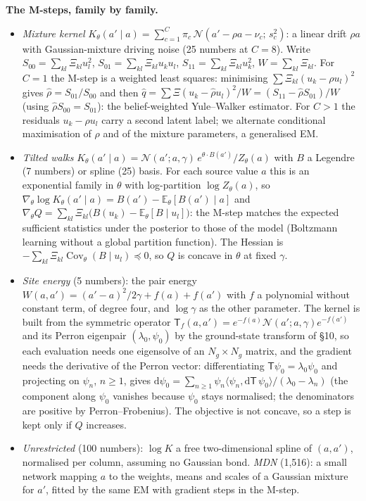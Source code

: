 \textbf{The M-steps, family by family.}
\begin{itemize}
\item \emph{Mixture kernel} $K_\theta(a'\mid a)=\sum_{c=1}^C\pi_c\,\mathcal N(a'-\rho a-\nu_c;\,s_c^2)$: a linear drift $\rho a$ with Gaussian-mixture driving noise (25 numbers at $C=8$). Write $S_{00}=\sum_{kl}\Xi_{kl}u_l^2$, $S_{01}=\sum_{kl}\Xi_{kl}u_ku_l$, $S_{11}=\sum_{kl}\Xi_{kl}u_k^2$, $W=\sum_{kl}\Xi_{kl}$.
For $C=1$ the M-step is a weighted least squares: minimising $\sum\Xi_{kl}(u_k-\rho u_l)^2$ gives $\hat\rho=S_{01}/S_{00}$ and then $\hat q=\sum\Xi(u_k-\hat\rho u_l)^2/W=(S_{11}-\hat\rho S_{01})/W$ (using $\hat\rho S_{00}=S_{01}$): the belief-weighted Yule--Walker estimator. For $C>1$ the residuals $u_k-\rho u_l$ carry a second latent label; we alternate conditional maximisation of $\rho$ and of
the mixture parameters, a generalised EM.
\item \emph{Tilted walks} $K_\theta(a'\mid a)=\mathcal N(a';a,\gamma)\,e^{\theta\cdot B(a')}/Z_\theta(a)$ with $B$ a Legendre (7 numbers) or spline (25) basis. For each source value $a$ this is an exponential family in $\theta$ with log-partition $\log Z_\theta(a)$, so
$\nabla_\theta\log K_\theta(a'\mid a)=B(a')-\mathbb E_\theta[B(a')\mid a]$ and $\nabla_\theta Q=\sum_{kl}\Xi_{kl}\big(B(u_k)-\mathbb E_\theta[B\mid u_l]\big)$: the M-step matches the expected sufficient statistics under the posterior to those of the model (Boltzmann learning without a global partition function).
The Hessian is $-\sum_{kl}\Xi_{kl}\operatorname{Cov}_\theta(B\mid u_l)\preceq0$, so $Q$ is concave in $\theta$ at fixed $\gamma$.
\item \emph{Site energy} (5 numbers): the pair energy $W(a,a')=(a'-a)^2/2\gamma+f(a)+f(a')$ with $f$ a polynomial without constant term, of degree four, and $\log\gamma$ as the other parameter. The kernel is built from the symmetric operator $\mathsf T_f(a,a')=e^{-f(a)}\mathcal N(a';a,\gamma)e^{-f(a')}$ and its
Perron eigenpair $(\lambda_0,\psi_0)$ by the ground-state transform of \S10, so each evaluation needs one eigensolve of an $N_g\times N_g$ matrix, and the gradient needs the derivative of the Perron vector: differentiating $\mathsf T\psi_0=\lambda_0\psi_0$ and projecting on $\psi_n$, $n\ge1$,
gives $\mathrm d\psi_0=\sum_{n\ge1}\psi_n\langle\psi_n,\mathrm d\mathsf T\,\psi_0\rangle/(\lambda_0-\lambda_n)$ (the component along $\psi_0$ vanishes because $\psi_0$ stays normalised; the denominators are positive by Perron--Frobenius). The objective is not concave, so a step is kept only if $Q$ increases.
\item \emph{Unrestricted} (100 numbers): $\log K$ a free two-dimensional spline of $(a,a')$, normalised per column, assuming no Gaussian bond. \emph{MDN} (1,516): a small network mapping $a$ to the weights, means and scales of a Gaussian mixture for $a'$, fitted by the same EM with gradient steps in the M-step.
\end{itemize}

